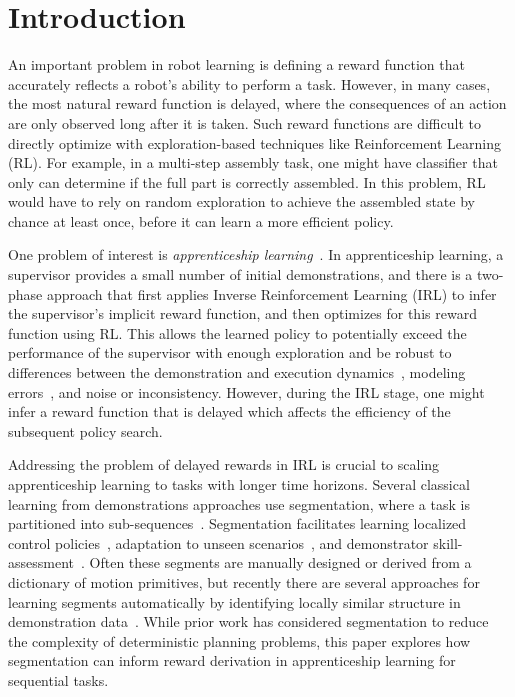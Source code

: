 \section{Introduction}
An important problem in robot learning is defining a reward function that accurately reflects a robot's ability to perform a task.
However, in many cases, the most natural reward function is delayed, where the consequences of an action are only observed long after it is taken.
Such reward functions are difficult to directly optimize with exploration-based techniques like Reinforcement Learning (RL).
For example, in a multi-step assembly task, one might have classifier that only can determine if the full part is correctly assembled.
In this problem, RL would have to rely on random exploration to achieve the assembled state by chance at least once, before it can learn a more efficient policy.

One problem of interest is \emph{apprenticeship learning}~\citep{DBLP:conf/nips/KolterAN07, coates2008learning, abbeel2004apprenticeship}.
In apprenticeship learning, a supervisor provides a small number of initial demonstrations, and there is a two-phase approach that first applies Inverse Reinforcement Learning (IRL) to infer the supervisor's implicit reward function, and then optimizes for this reward function using RL.
This allows the learned policy to potentially exceed the performance of the supervisor with enough exploration and be robust to differences between the demonstration and execution dynamics~\citep{abbeel2004apprenticeship}, modeling errors~\citep{ross2011reduction}, and noise or inconsistency. 
However, during the IRL stage, one might infer a reward function that is delayed which affects the efficiency of the subsequent policy search.

Addressing the problem of delayed rewards in IRL is crucial to scaling apprenticeship learning to tasks with longer time horizons.
Several classical learning from demonstrations approaches use segmentation, where a task is partitioned into sub-sequences~\citep{argall2009survey}.
Segmentation facilitates learning localized control policies~\citep{murali2015learning, niekum2012learning, konidaris2011robot}, adaptation to unseen scenarios~\citep{ijspreet2002learning, ude2010task}, and demonstrator skill-assessment~\citep{reiley2010motion, gao2014jigsaws}.
Often these segments are manually designed or derived from a dictionary of motion primitives, but recently there are several approaches for learning segments automatically by identifying locally similar structure in demonstration data~\citep{barbivc2004segmenting, chiappa2010movement,  alvarez2010switched,calinon2010learning, kruger2012imitation, niekum2012learning, wachter2015hierarchical, lee2015autonomous}.
While prior work has considered segmentation to reduce the complexity of deterministic planning problems, this paper explores how segmentation can inform reward derivation in apprenticeship learning for sequential tasks.

